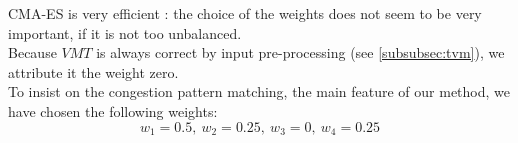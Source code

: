 CMA-ES is very efficient : the choice of the weights does not seem to be very important, if it is not too unbalanced.\\
Because $VMT$ is always correct by input pre-processing (see \ref{subsubsec:tvm}), we attribute it the weight zero.\\
To insist on the congestion pattern matching, the main feature of our method, we have chosen the following weights:\\
\begin{equation*}
	w_{1}=0.5,\ w_{2}=0.25,\ w_{3}=0,\ w_{4}=0.25
\end{equation*}